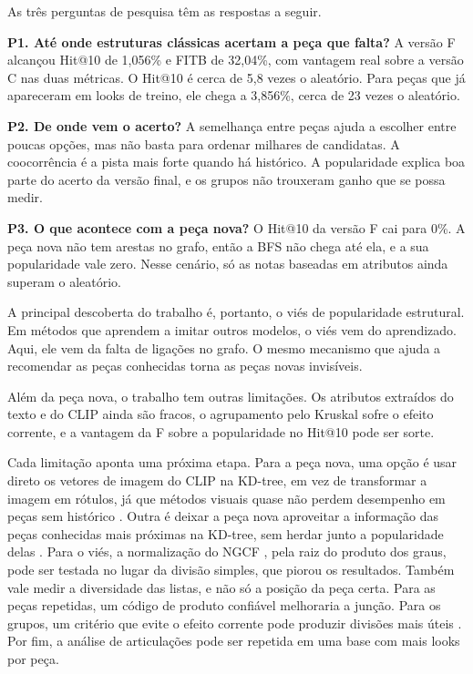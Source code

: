 \documentclass[conference]{IEEEtran}
\begin{document}
As três perguntas de pesquisa têm as respostas a seguir.

\textbf{P1. Até onde estruturas clássicas acertam a peça que falta?} A versão F alcançou Hit@10 de 1,056\% e FITB de 32,04\%, com vantagem real sobre a versão C nas duas métricas. O Hit@10 é cerca de 5,8 vezes o aleatório. Para peças que já apareceram em looks de treino, ele chega a 3,856\%, cerca de 23 vezes o aleatório.

\textbf{P2. De onde vem o acerto?} A semelhança entre peças ajuda a escolher entre poucas opções, mas não basta para ordenar milhares de candidatas. A coocorrência é a pista mais forte quando há histórico. A popularidade explica boa parte do acerto da versão final, e os grupos não trouxeram ganho que se possa medir.

\textbf{P3. O que acontece com a peça nova?} O Hit@10 da versão F cai para 0\%. A peça nova não tem arestas no grafo, então a BFS não chega até ela, e a sua popularidade vale zero. Nesse cenário, só as notas baseadas em atributos ainda superam o aleatório.

A principal descoberta do trabalho é, portanto, o viés de popularidade estrutural. Em métodos que aprendem a imitar outros modelos, o viés vem do aprendizado. Aqui, ele vem da falta de ligações no grafo. O mesmo mecanismo que ajuda a recomendar as peças conhecidas torna as peças novas invisíveis.

Além da peça nova, o trabalho tem outras limitações. Os atributos extraídos do texto e do CLIP ainda são fracos, o agrupamento pelo Kruskal sofre o efeito corrente, e a vantagem da F sobre a popularidade no Hit@10 pode ser sorte.

Cada limitação aponta uma próxima etapa. Para a peça nova, uma opção é usar direto os vetores de imagem do CLIP na KD-tree, em vez de transformar a imagem em rótulos, já que métodos visuais quase não perdem desempenho em peças sem histórico \cite{liu2020}. Outra é deixar a peça nova aproveitar a informação das peças conhecidas mais próximas na KD-tree, sem herdar junto a popularidade delas \cite{meehan2025}. Para o viés, a normalização do NGCF \cite{wang2019}, pela raiz do produto dos graus, pode ser testada no lugar da divisão simples, que piorou os resultados. Também vale medir a diversidade das listas, e não só a posição da peça certa. Para as peças repetidas, um código de produto confiável melhoraria a junção. Para os grupos, um critério que evite o efeito corrente pode produzir divisões mais úteis \cite{zahn1971}. Por fim, a análise de articulações pode ser repetida em uma base com mais looks por peça.
\end{document}
